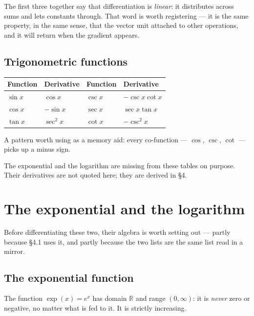 \documentclass[11pt]{article}
\theoremstyle{plain}
\theoremstyle{definition}
\theoremstyle{remark}
\newcommand{\R}{\mathbb{R}}
\begin{document}
\noindent The first three together say that differentiation is
\emph{linear}: it distributes across sums and lets constants through. That word
is worth registering --- it is the same property, in the same sense, that the
vector unit attached to other operations, and it will return when the gradient
appears.

\subsection{Trigonometric functions}
\begin{center}
\renewcommand{\arraystretch}{1.6}
\begin{tabular}{@{}l l @{\qquad\qquad} l l@{}}
\toprule
\textbf{Function} & \textbf{Derivative} &
\textbf{Function} & \textbf{Derivative} \\
\midrule
$\sin x$ & $\cos x$              & $\csc x$ & $-\csc x\cot x$ \\
$\cos x$ & $-\sin x$             & $\sec x$ & $\sec x\tan x$ \\
$\tan x$ & $\sec^{2}x$           & $\cot x$ & $-\csc^{2}x$ \\
\bottomrule
\end{tabular}
\end{center}

\noindent A pattern worth using as a memory aid: every co-function ---
$\cos$, $\csc$, $\cot$ --- picks up a minus sign.

\noindent The exponential and the logarithm are missing from these tables on
purpose. Their derivatives are not quoted here; they are derived in \S4.

\section{The exponential and the logarithm}
Before differentiating these two, their algebra is worth setting out --- partly
because \S4.1 uses it, and partly because the two lists are the same list read
in a mirror.

\subsection{The exponential function}
The function $\exp(x)=e^{x}$ has domain $\R$ and range $(0,\infty)$: it is
\emph{never} zero or negative, no matter what is fed to it. It is strictly
increasing.
\end{document}
